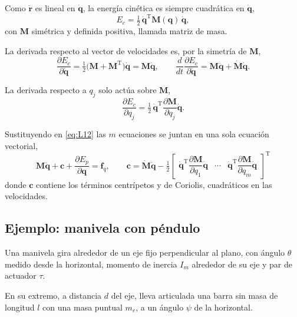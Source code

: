 \documentclass[11pt]{article}
\newcommand{\T}{^{\mathrm{T}}}
\newcommand{\pd}[2]{\frac{\partial #1}{\partial #2}}
\begin{document}
Como $\dot{\mathbf{r}}$ es lineal en $\dot{\mathbf{q}}$, la energía cinética es siempre cuadrática en $\dot{\mathbf{q}}$,
\begin{equation}
E_c=\tfrac12\,\dot{\mathbf{q}}\T\mathbf{M}(\mathbf{q})\,\dot{\mathbf{q}},
\label{eq:L13}
\end{equation}
con $\mathbf{M}$ simétrica y definida positiva, llamada matriz de masa.

La derivada respecto al vector de velocidades es, por la simetría de $\mathbf{M}$,
\begin{equation}
\pd{E_c}{\dot{\mathbf{q}}}=\tfrac12\big(\mathbf{M}+\mathbf{M}\T\big)\dot{\mathbf{q}}=\mathbf{M}\dot{\mathbf{q}},
\qquad
\frac{d}{dt}\pd{E_c}{\dot{\mathbf{q}}}=\mathbf{M}\ddot{\mathbf{q}}+\dot{\mathbf{M}}\dot{\mathbf{q}}.
\label{eq:L14}
\end{equation}

La derivada respecto a $q_j$ solo actúa sobre $\mathbf{M}$,
\begin{equation}
\pd{E_c}{q_j}=\tfrac12\,\dot{\mathbf{q}}\T\pd{\mathbf{M}}{q_j}\dot{\mathbf{q}} .
\label{eq:L15}
\end{equation}

Sustituyendo en \eqref{eq:L12} las $m$ ecuaciones se juntan en una sola ecuación vectorial,
\begin{equation}
\boxed{\ \mathbf{M}\ddot{\mathbf{q}}+\mathbf{c}+\pd{E_p}{\mathbf{q}}=\mathbf{f}_q,
\qquad
\mathbf{c}=\dot{\mathbf{M}}\dot{\mathbf{q}}-\tfrac12
\begin{bmatrix}
\dot{\mathbf{q}}\T\dfrac{\partial\mathbf{M}}{\partial q_1}\dot{\mathbf{q}} & \cdots & \dot{\mathbf{q}}\T\dfrac{\partial\mathbf{M}}{\partial q_m}\dot{\mathbf{q}}
\end{bmatrix}\T\ }
\label{eq:L16}
\end{equation}
donde $\mathbf{c}$ contiene los términos centrípetos y de Coriolis, cuadráticos en las velocidades.

\subsection{Ejemplo: manivela con péndulo}

Una manivela gira alrededor de un eje fijo perpendicular al plano, con ángulo $\theta$ medido desde la horizontal, momento de inercia $I_m$ alrededor de su eje y par de actuador $\tau$.

En su extremo, a distancia $d$ del eje, lleva articulada una barra sin masa de longitud $l$ con una masa puntual $m_e$, a un ángulo $\psi$ de la horizontal.
\end{document}

